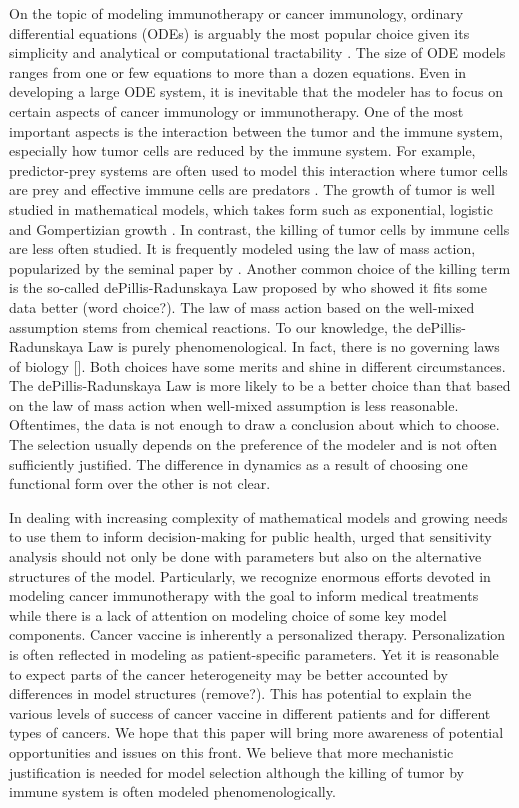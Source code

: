 \documentclass[review,authoryear]{elsarticle}
\begin{document}
On the topic of modeling immunotherapy or cancer immunology, ordinary
differential equations (ODEs) is arguably the most popular choice
given its simplicity and analytical or computational tractability
\citep{Eftimie2010}. The size of ODE models ranges from one or few
equations to more than a dozen equations. Even in developing a large
ODE system, it is inevitable that the modeler has to focus on certain
aspects of cancer immunology or immunotherapy. One of the most important
aspects is the interaction between the tumor and the immune system, especially
how tumor cells are reduced by the immune system. For example, predictor-prey
systems are often used to model this interaction where tumor cells
are prey and effective immune cells are predators \citep{Hamilton2022}. The growth of tumor is well studied in mathematical
models, which takes form such as exponential, logistic and Gompertizian
growth \citep{Murphy2016}. In contrast, the killing of tumor cells
by immune cells are less often studied. It is frequently modeled using
the law of mass action, popularized by the seminal paper by \citet{KUZNETSOV1994}.
Another common choice of the killing term is the so-called dePillis-Radunskaya
Law proposed by \citet{dePillis2014} who showed it fits some data
better (word choice?). The law of mass action based on the well-mixed
assumption stems from chemical reactions. To our knowledge, the dePillis-Radunskaya
Law is purely phenomenological. In fact, there is no governing laws
of biology {[}{]}. Both choices have some merits and shine in different
circumstances. The dePillis-Radunskaya Law is more likely to be a
better choice than that based on the law of mass action when well-mixed
assumption is less reasonable. Oftentimes, the data is not enough
to draw a conclusion about which to choose. The selection usually depends on the preference
of the modeler and is not often sufficiently justified. The difference in dynamics
as a result of choosing one functional form over the other is not
clear. 

In dealing with increasing complexity of mathematical models and growing
needs to use them to inform decision-making for public health, \citet{Basu2013} urged that sensitivity analysis should
not only be done with parameters but also on the alternative structures
of the model. Particularly, we recognize enormous efforts devoted
in modeling cancer immunotherapy with the goal to inform medical treatments
while there is a lack of attention on modeling choice of some key
model components. Cancer vaccine is inherently a personalized
therapy. Personalization is often reflected in modeling as patient-specific
parameters. Yet it is reasonable to expect parts of the cancer heterogeneity
may be better accounted by differences in model structures (remove?).
This has potential to explain the various levels of success of cancer
vaccine in different patients and for different types of cancers. We
hope that this paper will bring more awareness of potential opportunities
and issues on this front. We believe that more mechanistic justification
is needed for model selection although the killing of tumor by immune
system is often modeled phenomenologically.
\end{document}
